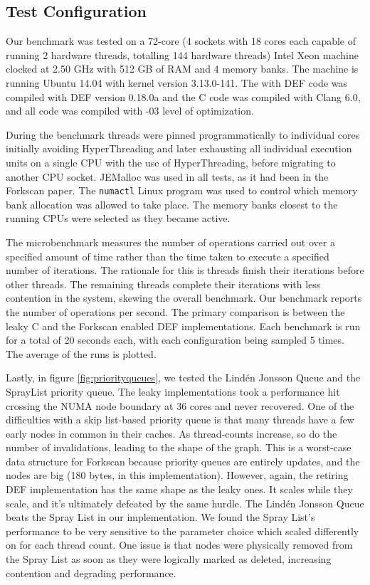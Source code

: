 \subsection{Test Configuration}

Our benchmark was tested on a 72-core (4 sockets with 18 cores each capable of running 2 hardware threads, totalling 144 hardware threads) Intel Xeon machine clocked at 2.50 GHz with 512 GB of RAM and 4 memory banks. The machine is running Ubuntu 14.04 with kernel version 3.13.0-141. The with DEF code was compiled with DEF version 0.18.0a and the C code was compiled with Clang 6.0, and all code was compiled with -03 level of optimization.

During the benchmark threads were pinned programmatically to individual cores initially avoiding HyperThreading and later exhausting all individual execution units on a single CPU with the use of HyperThreading, before migrating to another CPU socket. JEMalloc\cite{JEMalloc} was used in all tests, as it had been in the Forkscan paper.\cite{Forkscan} The \texttt{numactl} Linux program was used to control which memory bank allocation was allowed to take place. The memory banks closest to the running CPUs were selected as they became active.

The microbenchmark measures the number of operations carried out over a specified amount of time rather than the time taken to execute a specified number of iterations. The rationale for this is threads finish their iterations before other threads. The remaining threads complete their iterations with less contention in the system, skewing the overall benchmark. Our benchmark reports the number of operations per second. The primary comparison is between the leaky C and the Forkscan enabled DEF implementations. Each benchmark is run for a total of 20 seconds each, with each configuration being sampled 5 times. The average of the runs is plotted.

Lastly, in figure \ref{fig:priorityqueues}, we tested the Lind{\'e}n Jonsson Queue and the SprayList priority queue.  The leaky implementations took a performance hit crossing the NUMA node boundary at 36 cores and never recovered.  One of the difficulties with a skip list-based priority queue is that many threads have a few early nodes in common in their caches.  As thread-counts increase, so do the number of invalidations, leading to the shape of the graph.  This is a worst-case data structure for Forkscan because priority queues are entirely updates, and the nodes are big (180 bytes, in this implementation).  However, again, the retiring DEF implementation has the same shape as the leaky ones.  It scales while they scale, and it's ultimately defeated by the same hurdle. The Lind{\'e}n Jonsson Queue beats the Spray List in our implementation. We found the Spray List's performance to be very sensitive to the parameter choice which scaled differently on for each thread count. One issue is that nodes were physically removed from the Spray List as soon as they were logically marked as deleted, increasing contention and degrading performance. 

